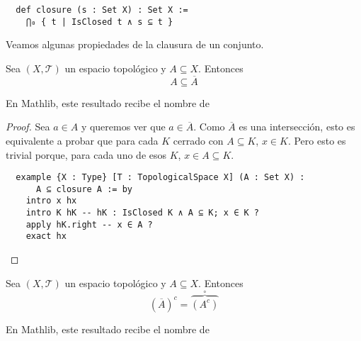 \begin{lstlisting}
  def closure (s : Set X) : Set X :=
    ⋂₀ { t | IsClosed t ∧ s ⊆ t }
\end{lstlisting}

Veamos algunas propiedades de la clausura de un conjunto.

\begin{proposition}
  Sea $(X, \mathcal{T})$ un espacio topológico y $A \subseteq X$. Entonces
  $$
  A \subseteq \overline{A}
  $$
\end{proposition}

En Mathlib, este resultado recibe el nombre de 

\begin{proof}
  Sea $a \in A$ y queremos ver que $a \in \overline{A}$. Como $\overline{A}$ es una intersección, esto es equivalente a probar que para cada $K$ cerrado con $A \subseteq K$, $x \in K$. Pero esto es trivial porque, para cada uno de esos $K$, $x \in A \subseteq K$.

  \begin{lstlisting}
  example {X : Type} [T : TopologicalSpace X] (A : Set X) :
      A ⊆ closure A := by
    intro x hx
    intro K hK -- hK : IsClosed K ∧ A ⊆ K; x ∈ K ?
    apply hK.right -- x ∈ A ?
    exact hx \end{lstlisting}
\end{proof}

\begin{proposition}
  Sea $(X, \mathcal{T})$ un espacio topológico y $A \subseteq X$. Entonces
  $$
  (\overline{A})^c = \overset{\circ}{\overbrace{(A^c)}} 
  $$
\end{proposition}

En Mathlib, este resultado recibe el nombre de 

